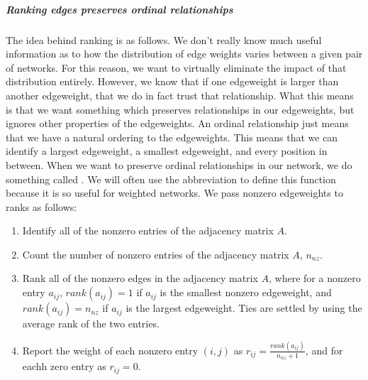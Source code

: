\documentclass[letterpaper,10pt,english]{jupyterBook}
\begin{document}
\subparagraph{Ranking edges preserves ordinal relationships}
\label{\detokenize{representations/ch4/regularization:ranking-edges-preserves-ordinal-relationships}}
\sphinxAtStartPar
The idea behind ranking is as follows. We don’t really know much useful information as to how the distribution of edge weights varies between a given pair of networks. For this reason, we want to virtually eliminate the impact of that distribution  entirely. However, we know that if one edge\sphinxhyphen{}weight is larger than another edge\sphinxhyphen{}weight, that we do in fact trust that relationship. What this means is that we want something which preserves  relationships in our edge\sphinxhyphen{}weights, but ignores other properties of the edge\sphinxhyphen{}weights. An ordinal relationship just means that we have a natural ordering to the edge\sphinxhyphen{}weights. This means that we can identify a largest edge\sphinxhyphen{}weight, a smallest edge\sphinxhyphen{}weight, and every position in between. When we want to preserve ordinal relationships in our network, we do something called . We will often use the abbreviation  to define this function because it is so useful for weighted networks. We pass non\sphinxhyphen{}zero edge\sphinxhyphen{}weights to ranks as follows:
\begin{enumerate}
%
\item {} 
\sphinxAtStartPar
Identify all of the non\sphinxhyphen{}zero entries of the adjacency matrix \(A\).

\item {} 
\sphinxAtStartPar
Count the number of non\sphinxhyphen{}zero entries of the adjacency matrix \(A\), \(n_{nz}\).

\item {} 
\sphinxAtStartPar
Rank all of the non\sphinxhyphen{}zero edges in the adjacency matrix \(A\), where for a non\sphinxhyphen{}zero entry \(a_{ij}\), \(rank(a_{ij}) = 1\) if \(a_{ij}\) is the smallest non\sphinxhyphen{}zero edge\sphinxhyphen{}weight, and \(rank(a_{ij}) = n_{nz}\) if \(a_{ij}\) is the largest edge\sphinxhyphen{}weight. Ties are settled by using the average rank of the two entries.

\item {} 
\sphinxAtStartPar
Report the weight of each non\sphinxhyphen{}zero entry \((i,j)\) as \(r_{ij} = \frac{rank(a_{ij})}{n_{nz} + 1}\), and for eachh zero entry as \(r_{ij} = 0\).

\end{enumerate}
\end{document}

